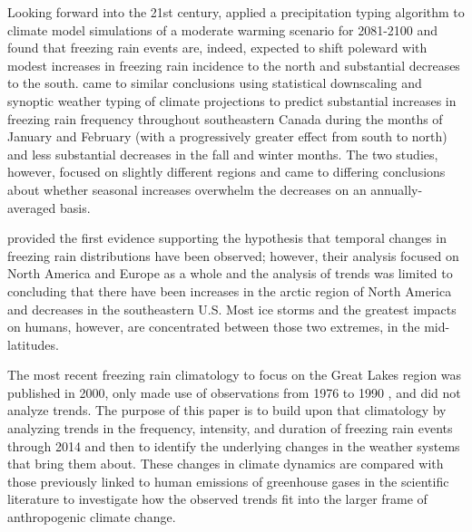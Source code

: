 \documentclass[twocol]{ametsoc}
\begin{document}
Looking forward into the 21st century, \citet{lambert2011simulated} applied a precipitation typing algorithm to climate model simulations of a moderate warming scenario for 2081-2100 and found that freezing rain events are, indeed, expected to shift poleward with modest increases in freezing rain incidence to the north and substantial decreases to the south. \citet{cheng2011possible} came to similar conclusions using statistical downscaling and synoptic weather typing of climate projections to predict substantial increases in freezing rain frequency throughout southeastern Canada during the months of January and February (with a progressively greater effect from south to north) and less substantial decreases in the fall and winter months. The two studies, however, focused on slightly different regions and came to differing conclusions about whether seasonal increases overwhelm the decreases on an annually-averaged basis. 

\citet{groisman2016recent} provided the first evidence supporting the hypothesis that temporal changes in freezing rain distributions have been observed; however, their analysis focused on North America and Europe as a whole and the analysis of trends was limited to concluding that there have been increases in the arctic region of North America and decreases in the southeastern U.S. Most ice storms and the greatest impacts on humans, however, are concentrated between those two extremes, in the mid-latitudes.

The most recent freezing rain climatology to focus on the Great Lakes region was published in 2000, only made use of observations from 1976 to 1990 \citep{cortinas2000climatology}, and did not analyze trends. The purpose of this paper is to build upon that climatology by analyzing trends in the frequency, intensity, and duration of freezing rain events through 2014 and then to identify the underlying changes in the weather systems that bring them about. These changes in climate dynamics are compared with those previously linked to human emissions of greenhouse gases in the scientific literature to investigate how the observed trends fit into the larger frame of anthropogenic climate change.
\end{document}
